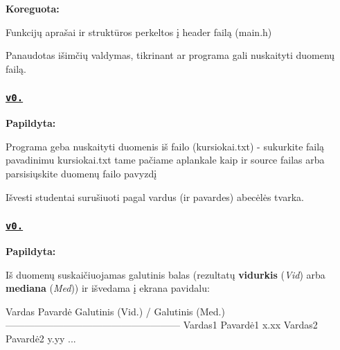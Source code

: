{\bfseries Koreguota\+:}


\begin{DoxyItemize}
\item Funkcijų aprašai ir struktūros perkeltos į {\ttfamily header} failą ({\ttfamily main.\+h})
\item Panaudotas išimčių valdymas, tikrinant ar programa gali nuskaityti duomenų failą.
\end{DoxyItemize}

\subsubsection*{\href{https://github.com/KlauMack/Duomenu_apdorojimas/releases/tag/v0.2}{\tt v0.}}

{\bfseries Papildyta\+:}


\begin{DoxyItemize}
\item Programa geba nuskaityti duomenis iš failo ({\ttfamily kursiokai.\+txt}) -\/ sukurkite failą pavadinimu {\ttfamily kursiokai.\+txt} tame pačiame aplankale kaip ir {\ttfamily source} failas arba parsisiųskite duomenų failo pavyzdį
\item Išvesti studentai surušiuoti pagal vardus (ir pavardes) abecėlės tvarka.
\end{DoxyItemize}

\subsubsection*{\href{https://github.com/KlauMack/Duomenu_apdorojimas/releases/tag/v0.1}{\tt v0.}}

{\bfseries Papildyta\+:}


\begin{DoxyItemize}
\item Iš duomenų suskaičiuojamas galutinis balas (rezultatų {\bfseries vidurkis} ({\itshape Vid}) arba {\bfseries mediana} ({\itshape Med})) ir išvedama į ekrana pavidalu\+: 
\begin{DoxyCode}
Vardas   Pavardė   Galutinis (Vid.) / Galutinis (Med.)
------------------------------------------------------
Vardas1  Pavardė1  x.xx
Vardas2  Pavardė2  y.yy
...
\end{DoxyCode}
 
\end{DoxyItemize}